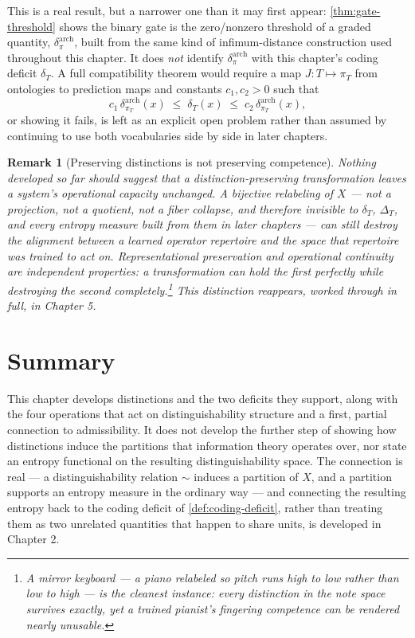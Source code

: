\documentclass[12pt]{report}
\newtheorem{remark}[definition]{Remark}
\begin{document}
This is a real result, but a narrower one than it may first appear:
\cref{thm:gate-threshold} shows the binary gate is the zero/nonzero
threshold of a graded quantity, $\delta_\pi^{\mathrm{arch}}$, built from
the same kind of infimum-distance construction used throughout this
chapter. It does \emph{not} identify $\delta_\pi^{\mathrm{arch}}$ with
this chapter's coding deficit $\delta_T$. A full compatibility theorem
would require a map $J : T \mapsto \pi_T$ from ontologies to prediction
maps and constants $c_1, c_2 > 0$ such that
\[
c_1 \, \delta_{\pi_T}^{\mathrm{arch}}(x) \;\leq\; \delta_T(x) \;\leq\; c_2 \, \delta_{\pi_T}^{\mathrm{arch}}(x),
\]
or showing it fails, is left as an explicit open problem rather than
assumed by continuing to use both vocabularies side by side in later
chapters.

\begin{remark}[Preserving distinctions is not preserving competence]
\label{rem:preservation-not-continuity}
Nothing developed so far should suggest that a distinction-preserving
transformation leaves a system's operational capacity unchanged. A
bijective relabeling of $X$ --- not a projection, not a quotient, not a
fiber collapse, and therefore invisible to $\delta_T$, $\Delta_T$, and
every entropy measure built from them in later chapters --- can still
destroy the alignment between a learned operator repertoire and the
space that repertoire was trained to act on. Representational
preservation and operational continuity are independent properties: a
transformation can hold the first perfectly while destroying the second
completely.\footnote{A mirror keyboard --- a piano relabeled so pitch
runs high to low rather than low to high --- is the cleanest instance:
every distinction in the note space survives exactly, yet a trained
pianist's fingering competence can be rendered nearly unusable.} This
distinction reappears, worked through in full, in Chapter 5.
\end{remark}

\section*{Summary}

This chapter develops distinctions and the two deficits they support,
along with the four operations that act on distinguishability structure
and a first, partial connection to admissibility. It does not develop
the further step of showing how distinctions induce the partitions that
information theory operates over, nor state an entropy functional on the
resulting distinguishability space. The connection is real --- a
distinguishability relation $\sim$ induces a partition of $X$, and a
partition supports an entropy measure in the ordinary way --- and
connecting the resulting entropy back to the coding deficit of
\cref{def:coding-deficit}, rather than treating them as two unrelated
quantities that happen to share units, is developed in Chapter 2.
\end{document}
